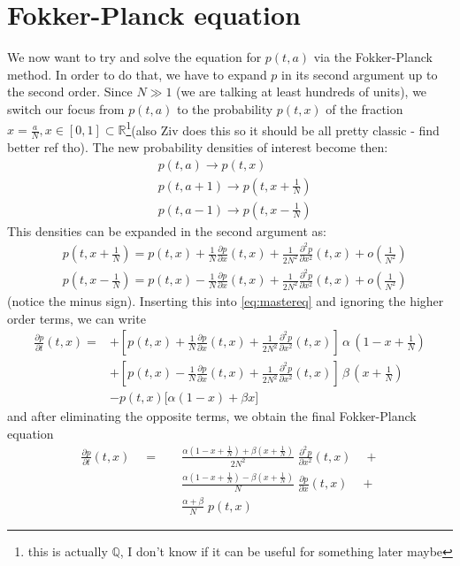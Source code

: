 \documentclass{article}
\newcommand{\red}[1]{{\color{red}#1}}
\newcommand{\dex}[1]{\frac{\partial#1}{\partial x}}
\newcommand{\dt}[1]{\frac{\partial#1}{\partial t}}
\newcommand{\ddex}[1]{\frac{\partial^2#1}{\partial x^2}}
\begin{document}
	\section{Fokker-Planck equation}
	We now want to try and solve the equation for $p(t,a)$ via the Fokker-Planck
	method. In order to do that, we have to expand $p$ in its second argument up
	to the second order. Since $N \gg 1$ (we are talking at least hundreds of
	units), we switch our focus from $p(t,a)$ to the probability $p(t,x)$ of the
	fraction $x = \frac{a}{N}, x \in [0,1] \subset \mathbb{R}$\footnote{this is
	actually $\mathbb{Q}$, I don't know if it can be useful for something later
	maybe}\red{(also Ziv does this so it should be all pretty classic - find
	better ref tho)}. The new probability densities of interest become then: 
	\begin{align*}
		& p(t,a) \rightarrow p(t,x)\\
		& p(t,a+1) \rightarrow p(t, x + \frac{1}{N})\\
		& p(t,a-1) \rightarrow p(t, x - \frac{1}{N})
	\end{align*}
	This densities can be expanded in the second argument as:
	\begin{align*}
		& p(t,x + \frac{1}{N}) = p(t,x) + \frac{1}{N}\dex{p}(t,x) +
		\frac{1}{2N^2}\ddex{p}(t,x) + o\left(\frac{1}{N^2}\right)\\[6pt]
		& p(t,x - \frac{1}{N}) = p(t,x) - \frac{1}{N}\dex{p}(t,x) +
		\frac{1}{2N^2}\ddex{p}(t,x) + o\left(\frac{1}{N^2}\right)
	\end{align*}
	(notice the minus sign). Inserting this into \eqref{eq:mastereq} and ignoring the higher order terms,
	we can write
	\begin{equation*}
		\begin{aligned}
			\dt{p}(t,x) = &+ \left[ p(t,x) + \frac{1}{N}\dex{p}(t,x) +
			\frac{1}{2N^2}\ddex{p}(t,x) \right] \, \alpha \, (1-x+\frac{1}{N})\\
			&+ \left[ p(t,x) - \frac{1}{N}\dex{p}(t,x) +
			\frac{1}{2N^2}\ddex{p}(t,x) \right] \, \beta \, (x+\frac{1}{N})\\
			&- p(t,x) \Big[ \alpha ( 1 - x )  + \beta x \Big]
		\end{aligned}
	\end{equation*}
	and after eliminating the opposite terms, we obtain the final Fokker-Planck
	equation
	\begin{equation}\label{eq:fokker}
		\begin{aligned}
			\dt{p}(t,x) \quad = \quad & \frac{\alpha \left(1-x+\frac{1}{N}\right) +
			\beta\left(x+\frac{1}{N}\right)}{2N^2} \; \ddex{p}(t,x) \quad + \\[6pt]
			& \frac{\alpha \left(1-x+\frac{1}{N}\right) -
			\beta\left(x+\frac{1}{N}\right)}{N} \; \dex{p}(t,x) \quad + \\[6pt]
			&\frac{\alpha + \beta}{N} \; p(t,x)
		\end{aligned}
	\end{equation}
	
\end{document}
